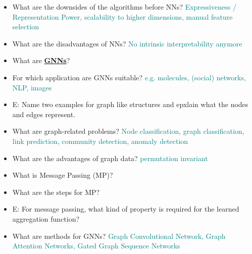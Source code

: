 \documentclass{report}
\newcommand{\asw}[2][teal]{}
\renewcommand{\asw}[2][teal]{\textcolor{#1}{#2}}
\begin{document}
\begin{itemize}
		\item What are the downsides of the algorithms before NNs?
		\asw{\newline Expressiveness / Representation Power, scalability to higher dimensions, manual feature selection}
		\item What are the disadvantages of NNs?
		\asw{\newline No intrinsic interpretability anymore}
		
		\item What are \textbf{\underline{GNNs}}?
		\asw{\newline }
		\item For which application are GNNs suitable?
		\asw{\newline e.g. molecules, (social) networks, NLP, images}
		\item E: Name two examples for graph like structures and epxlain what the nodes and edges represent.
		\asw{\newline }
		\item What are graph-related problems?
		\asw{\newline Node classification, graph classification, link prediction, community detection, anomaly detection}
		\item What are the advantages of graph data?
		\asw{\newline permutation invariant}
		\item What is Message Passing (MP)?
		\asw{\newline }
		\item What are the steps for MP?
		\asw{\newline }
		\item E: For message passing, what kind of property is required for the learned aggregation function?
		\asw{\newline }
		\item What are methods for GNNs?
		\asw{\newline Graph Convolutional Network, Graph Attention Networks, Gated Graph Sequence Networks}
		

\end{itemize}
\end{document}
